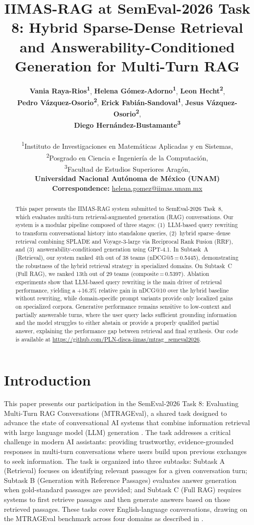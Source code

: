 \documentclass[11pt]{article}
\title{IIMAS-RAG at SemEval-2026 Task 8: Hybrid Sparse-Dense Retrieval and Answerability-Conditioned Generation for Multi-Turn RAG}
\author{
  \textbf{Vania Raya-Rios\textsuperscript{1}}, 
  \textbf{Helena Gómez-Adorno\textsuperscript{1}}, 
  \textbf{Leon Hecht\textsuperscript{2}}, \\
  \textbf{Pedro Vázquez-Osorio\textsuperscript{2}},
  \textbf{Erick Fabián-Sandoval\textsuperscript{1}}, 
  \textbf{Jesus Vázquez-Osorio\textsuperscript{2}}, \\
  \textbf{Diego Hernández-Bustamante\textsuperscript{3}}\\
  \\
\textsuperscript{1}Instituto de Investigaciones en Matemáticas Aplicadas y en Sistemas,\\
 \textsuperscript{2}Posgrado en Ciencia e Ingeniería de la Computación,\\
 \textsuperscript{3}Facultad de Estudios Superiores Aragón,\\
 \textbf{Universidad Nacional Autónoma de México (UNAM)}\\
  \small{\textbf{Correspondence:} \href{mailto:helena.gomez@iimas.unam.mx}{helena.gomez@iimas.unam.mx}}
}
\begin{document}
\maketitle


\begin{abstract}
This paper presents the IIMAS-RAG system submitted to SemEval-2026 Task~8, which evaluates multi-turn retrieval-augmented generation (RAG) conversations.
Our system is a modular pipeline composed of three stages: (1)~LLM-based query rewriting to transform conversational history into standalone queries, (2)~hybrid sparse--dense retrieval combining SPLADE and Voyage-3-large via Reciprocal Rank Fusion (RRF), and (3)~answerability-conditioned generation using GPT-4.1.
In Subtask~A (Retrieval), our system ranked 4th out of 38 teams (nDCG@5\,=\,0.5445), demonstrating the robustness of the hybrid retrieval strategy in specialized domains.
On Subtask~C (Full RAG), we ranked 13th out of 29 teams (composite\,=\,0.5397).
Ablation experiments show that LLM-based query rewriting is the main driver of retrieval performance, yielding a +16.3\% relative gain in nDCG@10 over the hybrid baseline without rewriting, while domain-specific prompt variants provide only localized gains on specialized corpora. Generative performance remains sensitive to low-context and partially answerable turns, where the user query lacks sufficient grounding information and the model struggles to either abstain or provide a properly qualified partial answer, explaining the performance gap between retrieval and final synthesis.
Our code is available at \url{https://github.com/PLN-disca-iimas/mtrag_semeval2026}.
\end{abstract}

\section{Introduction}


This paper presents our participation in the SemEval-2026 Task 8: Evaluating Multi-Turn RAG Conversations (MTRAGEval), a shared task designed to advance the state of conversational AI systems that combine information retrieval with large language model (LLM) generation \cite{10.1162/TACL.a.19}. The task addresses a critical challenge in modern AI assistants: providing trustworthy, evidence-grounded responses in multi-turn conversations where users build upon previous exchanges to seek information. The task is organized into three subtasks: Subtask A (Retrieval) focuses on identifying relevant passages for a given conversation turn; Subtask B (Generation with Reference Passages) evaluates answer generation when gold-standard passages are provided; and Subtask C (Full RAG) requires systems to first retrieve passages and then generate answers based on those retrieved passages. These tasks cover English-language conversations, drawing on the MTRAGEval benchmark across four domains as described in \citet{rosenthal2026mtragunbenchmarkopenchallenges}.
\end{document}
